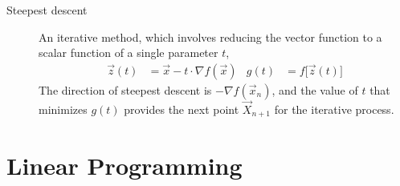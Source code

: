 \begin{description}
    \item[Steepest descent] An iterative method, which involves reducing the vector
        function to a scalar function of a single parameter $ t $,
        \begin{align}
            \vec{z}(t) & = \vec{x} - t \cdot \nabla f (\vec{x}) &
            g(t)       & = f\Big[\vec{z}(t)\Big]
        \end{align}
        The direction of steepest descent is $ -\nabla f(\vec{x}_n) $, and the value of
        $ t $ that minimizes $ g(t)  $ provides the next point $ \vec{X}_{n+1} $ for the
        iterative process.
\end{description}

\section{Linear Programming}

